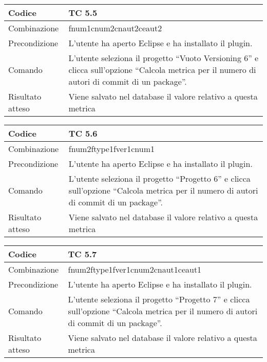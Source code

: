 \begin{table}[ht]
\begin{tabular}{|p{3cm}|p{9cm}|}
\hline
\cellcolor{lightgray}Codice				& TC 5.5								\\
\hline
\cellcolor{lightgray}Combinazione		& fnum1cnum2cnaut2ceaut2 									\\
\hline
\cellcolor{lightgray}Precondizione		& L'utente ha aperto Eclipse e ha installato il plugin.			\\
\hline
\cellcolor{lightgray}Comando			& L'utente seleziona il progetto ``Vuoto Versioning 6''  e clicca sull'opzione ``Calcola metrica per il numero di autori di commit di un package''.	\\
\hline
\cellcolor{lightgray}Risultato atteso	& Viene salvato nel database il valore relativo a questa metrica	\\
\hline
\end{tabular}
\end{table}

\begin{table}[ht]
\begin{tabular}{|p{3cm}|p{9cm}|}
\hline
\cellcolor{lightgray}Codice				& TC 5.6								\\
\hline
\cellcolor{lightgray}Combinazione		& fnum2ftype1fver1cnum1								\\
\hline
\cellcolor{lightgray}Precondizione		& L'utente ha aperto Eclipse e ha installato il plugin.				\\
\hline
\cellcolor{lightgray}Comando			& L'utente seleziona il progetto ``Progetto 6''  e clicca sull'opzione ``Calcola metrica per il numero di autori di commit di un package''.	\\
\hline
\cellcolor{lightgray}Risultato atteso	& Viene salvato nel database il valore relativo a questa metrica	\\
\hline
\end{tabular}
\end{table}

\begin{table}[ht]
\begin{tabular}{|p{3cm}|p{9cm}|}
\hline
\cellcolor{lightgray}Codice				& TC 5.7								\\
\hline
\cellcolor{lightgray}Combinazione		& fnum2ftype1fver1cnum2cnaut1ceaut1							\\
\hline
\cellcolor{lightgray}Precondizione		& L'utente ha aperto Eclipse e ha installato il plugin.									\\
\hline
\cellcolor{lightgray}Comando			& L'utente seleziona il progetto ``Progetto 7''  e clicca sull'opzione ``Calcola metrica per il numero di autori di commit di un package''.	\\
\hline
\cellcolor{lightgray}Risultato atteso	& Viene salvato nel database il valore relativo a questa metrica	\\
\hline
\end{tabular}
\end{table}


